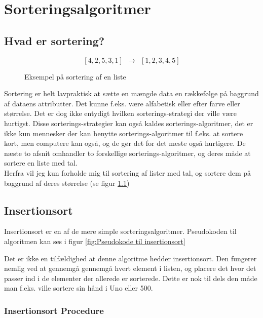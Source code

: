 \chapter{Sorteringsalgoritmer}
\label{ch:Sorteringsalgoritmer}

\section{Hvad er sortering?}
\label{sec:Hvad er sortering?}

\begin{figure}
	\begin{center}
		$$[4,2,5,3,1] \:\:\longrightarrow\:\: [1,2,3,4,5]$$
	\end{center}
	\caption{Eksempel på sortering af en liste}
	\label{fig:Eksempel på sortering af en liste}
\end{figure}


Sortering er helt lavpraktisk at sætte en mængde data en rækkefølge på baggrund af dataens attributter. Det kunne f.eks. være alfabetisk eller efter farve eller størrelse. Det er dog ikke entydigt hvilken sorterings-strategi der ville være hurtigst. Disse sorterings-strategier kan også kaldes sorterings-algoritmer, det er ikke kun mennesker der kan benytte sorterings-algoritmer til f.eks. at sortere kort, men computere kan også, og de gør det for det meste også hurtigere. De næste to afsnit omhandler to forskellige sorterings-algoritmer, og deres måde at sortere en liste med tal.\\


Herfra vil jeg kun forholde mig til sortering af lister med tal, og sortere dem på baggrund af deres størrelse (se figur \ref{fig:Eksempel på sortering af en liste})


\section{Insertionsort}
\label{sec:Insertionsort}

Insertionsort er en af de mere simple sorteringsalgoritmer. Pseudokoden til algoritmen kan ses i figur \ref{fig:Pseudokode til insertionsort}


Det er ikke en tilfældighed at denne algoritme hedder insertionsort. Den fungerer nemlig ved at gennemgå gennemgå hvert element i listen, og placere det hvor det passer ind i de elementer der allerede er sorterede. Dette er nok til dels den måde man f.eks. ville sortere sin hånd i Uno eller 500. 

\subsection{Insertionsort Procedure}%
\label{sub:Insertionsort Procedure}

